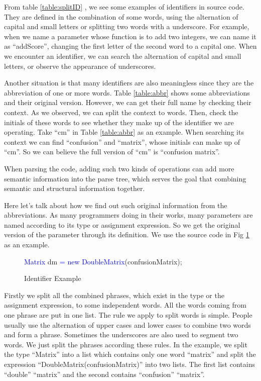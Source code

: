 From table \ref{table:splitID}
, we see some examples of identifiers in source code. They are defined in the combination of some words, using the alternation of capital and small
letters or splitting two words with a underscore. For example, when we name a parameter whose function is to add two integers, we can name it as ``addScore'',
changing the first letter of the second word to a capital one. When we encounter an identifier, we can search the alternation of capital and small letters, or
observe the appearance of underscores.

Another situation is that many identifiers are also meaningless since they are the abbreviation of one or more words. Table \ref{table:abbr} shows some abbreviations and
their original version. However, we can get their full name by checking their context. As we observed, we can split the context to words. Then, check the
initials of these words to see whether they make up of the identifier we are operating. Take ``cm'' in Table \ref{table:abbr} as an example. When searching its context we can
find ``confusion'' and ``matrix'', whose initials can make up of ``cm''. So we can believe the full version of ``cm'' is ``confusion matrix''.

When parsing the code, adding such two kinds of operations can add more semantic information into the parse tree, which serves the goal that combining
semantic and structural information together.

Here let's talk about how we find out such original information from the abbreviations. As many programmers doing in their works,
many parameters are named according to its type or assignment expression. So we get the original version of the parameter through its definition. We use the %
source code in Fig \ref{figure:indentifier} as an example.

\begin{figure}[!htp]
 \centering
\textcolor{blue}{ Matrix} dm \textcolor{blue}{= new DoubleMatrix}(confusionMatrix);
 \caption{\label{figure:indentifier} Identifier Example}
\end{figure}

Firstly we split all the combined phrases, which exist in the type or the assignment expression, to some independent words. All the words coming from one phrase are put in one list. The rule we apply to split words is simple. People usually use the alternation of upper cases and lower cases to combine two words and form a phrase. Sometimes the underscores are also used to segment two words. We just split the phrases according these rules. In the example, we split the type ``Matrix'' into a list which contains only one word ``matrix'' and split the expression
``DoubleMatrix(confusionMatrix)'' into two lists. The first list contains ``double'' ``matrix'' and the second contains ``confusion'' ``matrix''.

